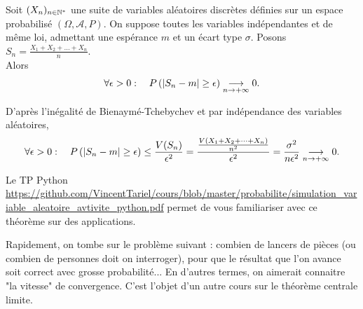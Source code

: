 \documentclass{book}
\begin{document}
\begin{Theoreme}
Soit $(X_n)_{n\in\mathbb{N}^*}$ une suite de variables aléatoires discrètes définies sur un espace probabilisé $(\Omega,\mathcal{A} ,P)$. On
suppose toutes les variables indépendantes et de même loi, admettant une espérance $m$ et un écart
type $\sigma$. Posons $S_n =\frac{X_1+X_2+\dots+X_n}{n}.$\\
Alors 
$$ \forall \epsilon>0: \quad P\left(\left| S_n - m \right|\geq \epsilon \right )\tend[n\to+\infty]0.$$
\end{Theoreme}
\begin{Demonstration}
D'après l'inégalité de Bienaymé-Tchebychev et par indépendance des variables aléatoires,
$$ \forall \epsilon>0: \quad P\left(\left| S_n - m \right|\geq \epsilon\right)\leq \frac{V(S_n)}{\epsilon^2}=\frac{\frac{V(X_1+X_2+\dots+X_n)}{n^2}}{\epsilon^2}=\frac{\sigma^2}{n\epsilon^2} \tend[n\to+\infty]0.$$
\end{Demonstration}
\begin{Remarque}
Le TP Python \url{https://github.com/VincentTariel/cours/blob/master/probabilite/simulation_variable_aleatoire_avtivite_python.pdf} permet de vous familiariser avec ce théorème sur des applications.
\end{Remarque}
Rapidement, on tombe sur le problème suivant : combien de
lancers de pièces (ou combien de personnes doit on
interroger), pour que le résultat que l'on avance soit correct
avec grosse probabilité... En d'autres termes, on aimerait connaitre "la vitesse" de
convergence. C'est l'objet d'un autre cours sur le théorème centrale limite.
\end{document}
